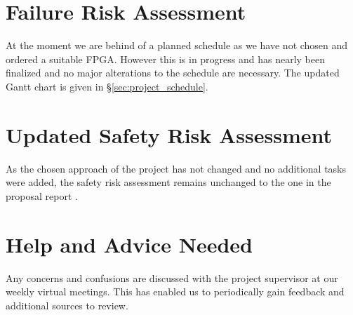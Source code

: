 \documentclass[a4paper,12pt]{article}
\begin{document}
	\section{Failure Risk Assessment}
	At the moment we are behind of a planned schedule as we have not chosen and ordered a suitable FPGA. However this is in progress and has nearly been finalized and no major alterations to the schedule are necessary. The updated Gantt chart is given in \S \ref{sec:project_schedule}.
	
	\section{Updated Safety Risk Assessment}
    As the chosen approach of the project has not changed and no additional tasks were added, the safety risk assessment remains unchanged to the one in the proposal report \autocite{proposal_report}.
    
    \section{Help and Advice Needed}
    Any concerns and confusions are discussed with the project supervisor at our weekly virtual meetings. This has enabled us to periodically gain feedback and additional sources to review.
	
\end{document}
